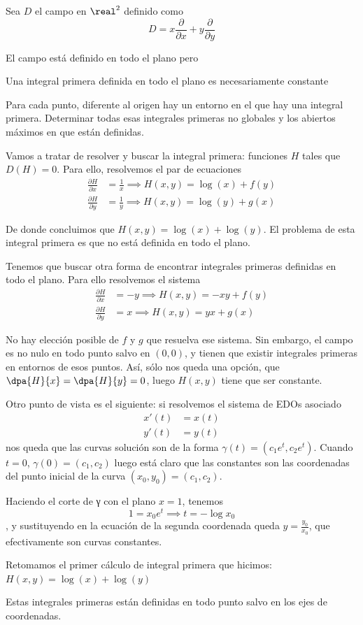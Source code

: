 \begin{problem}[2]
Sea $D$ el campo en $\real^2$ definido como
\[D=x \frac{\partial}{\partial x}+y \frac{\partial}{\partial y }\]

El campo está definido en todo el plano pero

\ppart Una integral primera definida en todo el plano es necesariamente constante

\ppart Para cada punto, diferente al origen hay un entorno en el que hay una integral primera. Determinar todas esas integrales primeras no globales y los abiertos máximos en que están definidas.
\solution


\yoP

\spart
Vamos a tratar de resolver y buscar la integral primera: funciones $H$ tales que $D(H) = 0$. Para ello, resolvemos el par de ecuaciones
\begin{align}
\frac{\partial H}{\partial x} &= \frac{1}{x} \implies H(x,y)=\log(x)+f(y)\\
\frac{\partial H}{\partial y} &= \frac{1}{y} \implies H(x,y)=\log(y)+g(x)
\end{align}

De donde concluimos que $H(x,y)=\log(x)+\log(y)$. El problema de esta integral primera es que no está definida en todo el plano.

Tenemos que buscar otra forma de encontrar integrales primeras definidas en todo el plano. Para ello resolvemos el sistema
\begin{align}
\frac{\partial H}{\partial x} &= -y \implies H(x,y)=-xy+f(y)\\
\frac{\partial H}{\partial y} &= x \implies H(x,y)=yx+g(x)
\end{align}

No hay elección posible de $f$ y $g$ que resuelva ese sistema. Sin embargo, el campo es no nulo en todo punto salvo en $(0,0)$, y tienen que existir integrales primeras en entornos de esos puntos. Así, sólo nos queda una opción, que $\dpa{H}{x} = \dpa{H}{y} = 0$, luego $H(x,y)$ tiene que ser constante.

Otro punto de vista es el siguiente: si resolvemos el sistema de EDOs asociado \begin{align*}
x'(t) &= x(t) \\
y'(t) &= y(t)
\end{align*} nos queda que las curvas solución son de la forma $γ(t) = (c_1e^t, c_2e^t)$. Cuando $t = 0$, $γ(0) = (c_1, c_2)$ luego está claro que las constantes son las coordenadas del punto inicial de la curva $(x_0, y_0) = (c_1, c_2)$.

Haciendo el corte de γ con el plano $x = 1$, tenemos \[ 1 = x_0e^t \implies t = - \log x_0 \], y sustituyendo en la ecuación de la segunda coordenada queda $y = \frac{y_0}{x_0}$, que efectivamente son curvas constantes.

\spart Retomamos el primer cálculo de integral primera que hicimos: $H(x,y)=\log(x)+\log(y)$

Estas integrales primeras están definidas en todo punto salvo en los ejes de coordenadas.

\end{problem}

